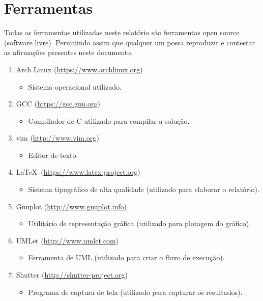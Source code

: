 \documentclass[12pt, hidelinks]{article}
\begin{document}
\newpage
\section{Ferramentas}
Todas as ferramentas utilizadas neste relatório são ferramentas open source (software livre). Permitindo assim que qualquer um possa reproduzir e contestar as afirmações presentes neste documento.

\begin{enumerate}
  \item Arch Linux (\url{https://www.archlinux.org})
    \begin{itemize}
      \item Sistema operacional utilizado.
    \end{itemize}
  \item GCC (\url{https://gcc.gnu.org})
    \begin{itemize}
      \item Compilador de C utilizado para compilar a solução.
    \end{itemize}
  \item vim (\url{http://www.vim.org})
    \begin{itemize}
      \item Editor de texto.
    \end{itemize}
  \item \LaTeX~(\url{https://www.latex-project.org})
    \begin{itemize}
      \item Sistema tipográfico de alta qualidade (utilizado para elaborar o relatório).
    \end{itemize}
  \item Gnuplot (\url{http://www.gnuplot.info})
    \begin{itemize}
      \item Utilitário de representação gráfica (utilizado para plotagem do gráfico).
    \end{itemize}
  \item UMLet (\url{http://www.umlet.com})
    \begin{itemize}
      \item Ferramenta de UML (utilizado para criar o fluxo de execução).
    \end{itemize}
  \item Shutter (\url{http://shutter-project.org})
    \begin{itemize}
      \item Programa de captura de tela (utilizado para capturar os resultados).
    \end{itemize}
\end{enumerate}

\end{document}
